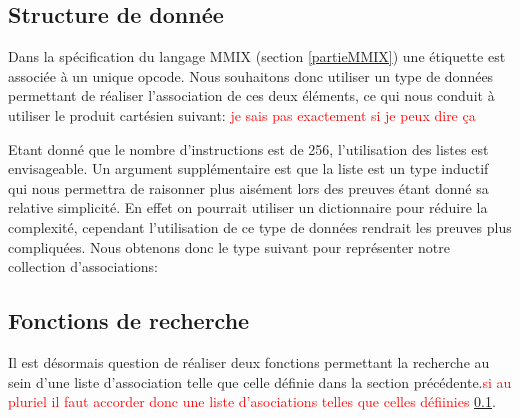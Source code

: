 \documentclass {article}
\newcommand{\codefrom}[3]
           {}
\theoremstyle{definition}
\theoremstyle{remark}
\newcommand{\todo}[1]{\textcolor{red}{#1}}
\begin{document}
\subsection{Structure de donnée}
\label{Structure de donnee}
Dans la spécification du langage MMIX (section \ref{partieMMIX})
une étiquette est associée à un unique opcode. Nous souhaitons donc
utiliser un type de données permettant de réaliser l'association de ces deux éléments,
ce qui nous conduit à utiliser le produit cartésien suivant: \todo{je sais pas exactement si je peux dire ça}
\codefrom{src}{association_list}{assoc}

Etant donné que le nombre
d'instructions est de 256, l'utilisation des listes est envisageable.
Un argument supplémentaire est que la liste
est un type inductif qui nous permettra de raisonner plus aisément
lors des preuves étant donné sa relative simplicité. En effet on pourrait utiliser
un dictionnaire pour réduire la complexité, cependant l'utilisation de ce 
type de données rendrait les preuves plus compliquées.
Nous obtenons donc le type suivant pour représenter notre collection d'associations:

\codefrom{src}{association_list}{tag_opcode_assoc}



\subsection{Fonctions de recherche}

Il est désormais question de réaliser deux fonctions permettant la recherche
au sein d'une liste d'association telle  que celle définie dans la section précédente.\todo {si au pluriel il faut accorder donc une liste d'asociations telles que celles défiinies}
\ref{Structure de donnee}.
\end{document}
